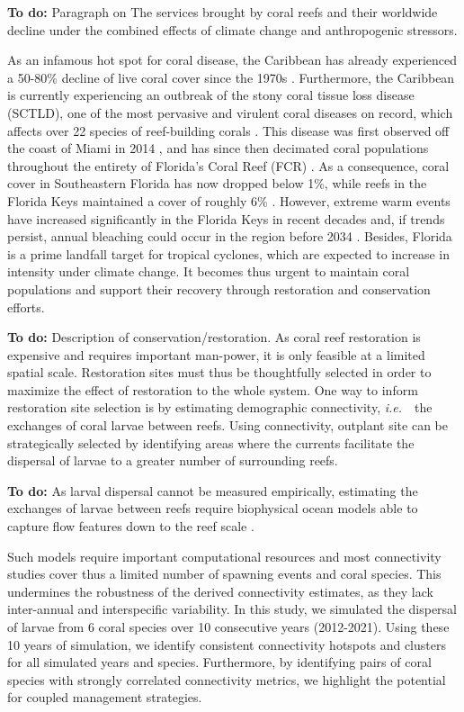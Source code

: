 \documentclass[preprint,12pt,authoryear]{elsarticle}
\newcommand{\ie}{{\it i.e.}\ }
\begin{document}
\textbf{To do: } Paragraph on The services brought by coral reefs and their worldwide decline under the combined effects of climate change and anthropogenic stressors.

As an infamous hot spot for coral disease, the Caribbean has already experienced a 50-80\% decline of live coral cover since the 1970s \citep{gardner2003long,jackson2014status}. Furthermore, the Caribbean is currently experiencing an outbreak of the stony coral tissue loss disease (SCTLD), one of the most pervasive and virulent coral diseases on record, which affects over 22 species of reef-building corals \citep{noaa2018,meiling2021variable}. This disease was first observed off the coast of Miami in 2014 \citep{precht2016unprecedented}, and has since then decimated coral populations throughout the entirety of Florida's Coral Reef (FCR) \citep{williams2021fine,frrp2021}. As a consequence, coral cover in Southeastern Florida has now dropped below 1\%, while reefs in the Florida Keys maintained a cover of roughly 6\% \citep{grove2022national}. However, extreme warm events have increased significantly in the Florida Keys in recent decades and, if trends persist, annual bleaching could occur in the region before 2034 \citep{manzello2015rapid}. Besides, Florida is a prime landfall target for tropical cyclones, which are expected to increase in intensity under climate change. It becomes thus urgent to maintain coral populations and support their recovery through restoration and conservation efforts.

\textbf{To do:} Description of conservation/restoration. As coral reef restoration is expensive and requires important man-power, it is only feasible at a limited spatial scale. Restoration sites must thus be thoughtfully selected in order to maximize the effect of restoration to the whole system. One way to inform restoration site selection is by estimating demographic connectivity, \ie~the exchanges of coral larvae between reefs. Using connectivity, outplant site can be strategically selected by identifying areas where the currents facilitate the dispersal of larvae to a greater number of surrounding reefs.

\textbf{To do: } As larval dispersal cannot be measured empirically, estimating the exchanges of larvae between reefs require biophysical ocean models able to capture flow features down to the reef scale \citep{saint2023biophysical}.

Such models require important computational resources and most connectivity studies cover thus a limited number of spawning events and coral species. This undermines the robustness of the derived connectivity estimates, as they lack inter-annual and interspecific variability. In this study, we simulated the dispersal of larvae from 6 coral species over 10 consecutive years (2012-2021). Using these 10 years of simulation, we identify consistent connectivity hotspots and clusters for all simulated years and species. Furthermore, by identifying pairs of coral species with strongly correlated connectivity metrics, we highlight the potential for coupled management strategies.
\end{document}
